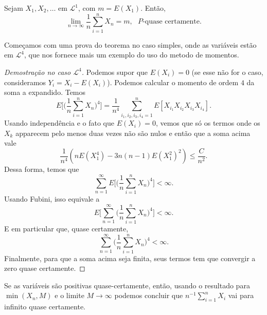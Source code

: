\begin{theorem}
  \label{t:LFGN}
  Sejam $X_1, X_2, \dots$ \iid em $\mathcal{L}^1$, com $m = E(X_1)$.
  Então,
  \begin{equation}
    \lim_{n \to \infty} \frac{1}{n} \sum_{i=1}^n X_n = m, \text{ $P$-quase certamente.}
  \end{equation}
\end{theorem}

Começamos com uma prova do teorema no caso simples, onde as variáveis estão em $\mathcal L^4$, que nos fornece mais um exemplo do uso do metodo de momentos.

\begin{proof}[Demostração no caso $\mathcal L^4$]
Podemos supor que $E(X_i) = 0$ (se esse não for o caso, consideramos $Y_i = X_i - E(X_i)$).
Podemos calcular o momento de ordem $4$ da soma a expandido.
Temos
\begin{equation*}
  E \bigg[ \bigg(\frac{1}{n} \sum_{i=1}^n X_n \bigg)^4 \Bigg]
  = \frac{1}{n^4} \sum_{i_1,i_2,i_3,i_4=1}^n
  E[X_{i_1}X_{i_2}X_{i_3}X_{i_4}].
\end{equation*}
Usando independência e o fato que $E(X_i) = 0$, vemos que só os termos onde os $X_{k}$ apparecem pelo menos duas vezes não são nulos e
então que a soma acima vale
$$\frac{1}{n^4}\left( n E(X^4_1) - 3n(n-1) E(X^2_1)^2 \right)\le \frac{C}{n^2}.$$
Dessa forma, temos que
\begin{equation}
  \sum_{n=1}^{\infty} E \bigg[
  \Big(\frac{1}{n} \sum_{i=1}^n X_n \Big)^4
  \bigg] < \infty.
\end{equation}
Usando Fubini, isso equivale a
\begin{equation}
 E \bigg[  \sum_{n=1}^{\infty} \bigg(\frac{1}{n} \sum_{i=1}^n X_n \bigg)^4 \bigg]<\infty.
\end{equation}
E em particular que, quase certamente,
\begin{equation}
  \sum_{n=1}^{\infty} \bigg(\frac{1}{n} \sum_{i=1}^n X_n \bigg)^4
  < \infty.
\end{equation}
Finalmente, para que a soma acima seja finita, seus termos tem que convergir a zero quase certamente.
\end{proof}

\begin{remark}
  Se as variáveis são positivas quase-certamente, então, usando o resultado para $\min(X_n,M)$ e o limite $M\to \infty$ podemos concluir que $n^{-1}\sum_{i=1}^n X_i$ vai para infinito quase certamente.
\end{remark}


